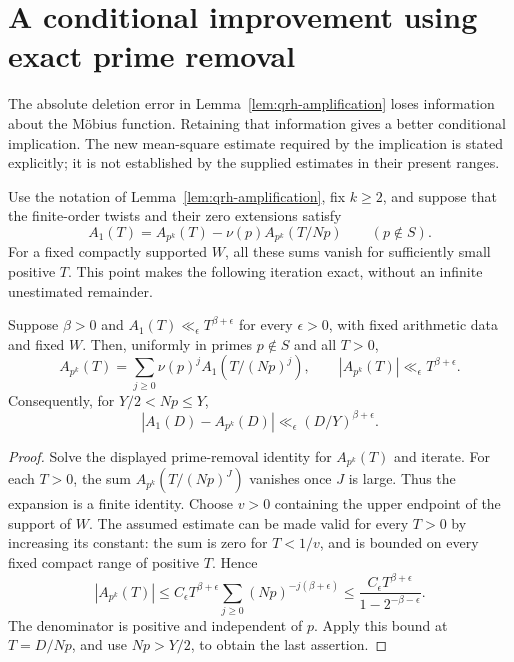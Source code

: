 \section{A conditional improvement using exact prime removal}
\label{sec:qrh-bootstrap}

The absolute deletion error in Lemma~\ref{lem:qrh-amplification}
loses information about the M\"obius function. Retaining that
information gives a better conditional implication. The new
mean-square estimate required by the implication is stated explicitly;
it is not established by the supplied estimates in their present ranges.

Use the notation of Lemma~\ref{lem:qrh-amplification}, fix
$k\ge2$, and suppose that the finite-order twists and their zero
extensions satisfy
\[
 A_1(T)=A_{p^k}(T)-\nu(p)A_{p^k}(T/Np)
       \qquad(p\notin S).
\]
For a fixed compactly supported $W$, all these sums vanish for
sufficiently small positive $T$. This point makes the following
iteration exact, without an infinite unestimated remainder.

\begin{lemma}
\label{lem:qrh-better-deletion}
Suppose $\beta>0$ and
$A_1(T)\ll_\epsilon T^{\beta+\epsilon}$ for every
$\epsilon>0$, with fixed arithmetic data and fixed $W$.
Then, uniformly in primes $p\notin S$ and all $T>0$,
\[
 A_{p^k}(T)=\sum_{j\ge0}\nu(p)^j A_1(T/(Np)^j),
 \qquad
 |A_{p^k}(T)|\ll_\epsilon T^{\beta+\epsilon}.
\]
Consequently, for $Y/2<Np\le Y$,
\[
 |A_1(D)-A_{p^k}(D)|
       \ll_\epsilon(D/Y)^{\beta+\epsilon}.
\]
\end{lemma}
\begin{proof}
Solve the displayed prime-removal identity for $A_{p^k}(T)$
and iterate. For each $T>0$, the sum $A_{p^k}(T/(Np)^J)$
vanishes once $J$ is large. Thus the expansion is a finite identity.
Choose $v>0$ containing the upper endpoint of the support
of $W$. The assumed estimate can be made valid for every
$T>0$ by increasing its constant: the sum is zero for
$T<1/v$, and is bounded on every fixed compact range of
positive $T$. Hence
\[
 |A_{p^k}(T)|\le
 C_\epsilon T^{\beta+\epsilon}
       \sum_{j\ge0}(Np)^{-j(\beta+\epsilon)}
 \le\frac{C_\epsilon T^{\beta+\epsilon}}
                {1-2^{-\beta-\epsilon}}.
\]
The denominator is positive and independent of $p$.
Apply this bound at $T=D/Np$, and use $Np>Y/2$,
to obtain the last assertion.
\end{proof}

